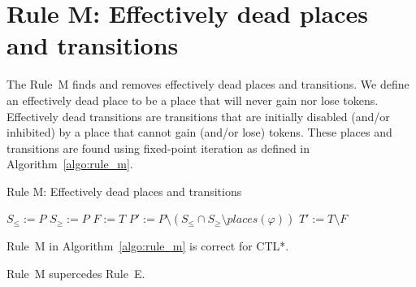\section*{Rule M: Effectively dead places and transitions}\label{sec:rule_m}
The Rule~M finds and removes effectively dead places and transitions.
We define an effectively dead place to be a place that will never gain nor lose tokens.
Effectively dead transitions are transitions that are initially disabled (and/or inhibited)
by a place that cannot gain (and/or lose) tokens.
These places and transitions are found using fixed-point iteration as defined in Algorithm~\ref{algo:rule_m}.

\begin{algorithm}
    \vspace{0.2cm}
    \caption{Rule M: Effectively dead places and transitions}
    \label{algo:rule_m}
    \DontPrintSemicolon
    \LinesNumbered
    \vspace{1mm}
    $S_\leq:=P$
    $S_\geq:=P$
    $F:=T$
    $P':=P\setminus(S_\leq\cap S_\geq\setminus places(\varphi))$\;
    $T':=T\setminus F$\;
    \vspace{0.2cm}
\end{algorithm}

\begin{theorem}\label{theorem:rule_m}
    Rule~M in Algorithm~\ref{algo:rule_m} is correct for CTL*.
\end{theorem}
\begin{theorem}\label{theorem:rule_m_supercedes_e}
Rule~M supercedes Rule~E.
\end{theorem}

